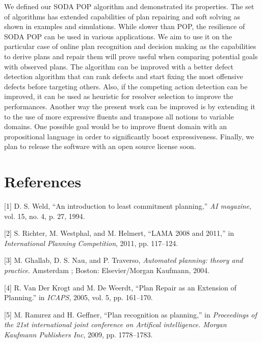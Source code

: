 \documentclass[]{article}
\begin{document}
We defined our SODA POP algorithm and demonstrated its properties. The
set of algorithms has extended capabilities of plan repairing and soft
solving as shown in examples and simulations. While slower than POP, the
resilience of SODA POP can be used in various applications. We aim to
use it on the particular case of online plan recognition and decision
making as the capabilities to derive plans and repair them will prove
useful when comparing potential goals with observed plans. The algorithm
can be improved with a better defect detection algorithm that can rank
defects and start fixing the most offensive defects before targeting
others. Also, if the competing action detection can be improved, it can
be used as heuristic for resolver selection to improve the performances.
Another way the present work can be improved is by extending it to the
use of more expressive fluents and transpose all notions to variable
domains. One possible goal would be to improve fluent domain with an
propositional language in order to significantly boost expressiveness.
Finally, we plan to release the software with an open source license
soon.

\section*{References}\label{references}

\hypertarget{refs}{}
\hypertarget{ref-weldux5fintroductionux5f1994}{}
{[}1{]} D. S. Weld, ``An introduction to least commitment planning,''
\emph{AI magazine}, vol. 15, no. 4, p. 27, 1994.

\hypertarget{ref-richterux5flamaux5f2011}{}
{[}2{]} S. Richter, M. Westphal, and M. Helmert, ``LAMA 2008 and 2011,''
in \emph{International Planning Competition}, 2011, pp. 117--124.

\hypertarget{ref-ghallabux5fautomatedux5f2004}{}
{[}3{]} M. Ghallab, D. S. Nau, and P. Traverso, \emph{Automated
planning: theory and practice}. Amsterdam ; Boston: Elsevier/Morgan
Kaufmann, 2004.

\hypertarget{ref-vanux5fderux5fkrogtux5fplanux5f2005}{}
{[}4{]} R. Van Der Krogt and M. De Weerdt, ``Plan Repair as an Extension
of Planning.'' in \emph{ICAPS}, 2005, vol. 5, pp. 161--170.

\hypertarget{ref-ramirezux5fplanux5f2009}{}
{[}5{]} M. Ramırez and H. Geffner, ``Plan recognition as planning,'' in
\emph{Proceedings of the 21st international joint conference on
Artifical intelligence. Morgan Kaufmann Publishers Inc}, 2009, pp.
1778--1783.
\end{document}
